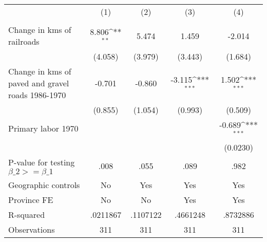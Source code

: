 {
\def\sym#1{\ifmmode^{#1}\else\(^{#1}\)\fi}
\begin{tabular}{l*{4}{c}}
\hline\hline
                &\multicolumn{1}{c}{(1)}&\multicolumn{1}{c}{(2)}&\multicolumn{1}{c}{(3)}&\multicolumn{1}{c}{(4)}\\
                &\multicolumn{1}{c}{}&\multicolumn{1}{c}{}&\multicolumn{1}{c}{}&\multicolumn{1}{c}{}\\
\hline
Change in kms of railroads&    8.806\sym{**} &    5.474         &    1.459         &   -2.014         \\
                &  (4.058)         &  (3.979)         &  (3.443)         &  (1.684)         \\
[1em]
Change in kms of paved and gravel roads 1986-1970&   -0.701         &   -0.860         &   -3.115\sym{***}&    1.502\sym{***}\\
                &  (0.855)         &  (1.054)         &  (0.993)         &  (0.509)         \\
[1em]
Primary labor 1970&                  &                  &                  &   -0.689\sym{***}\\
                &                  &                  &                  & (0.0230)         \\
\hline
P-value for testing $\beta\_{2} >= \beta\_{1}$&     .008         &     .055         &     .089         &     .982         \\
Geographic controls&       No         &      Yes         &      Yes         &      Yes         \\
Province FE     &       No         &       No         &      Yes         &      Yes         \\
R-squared       & .0211867         & .1107122         & .4661248         & .8732886         \\
Observations    &      311         &      311         &      311         &      311         \\
\hline\hline
\end{tabular}
}
